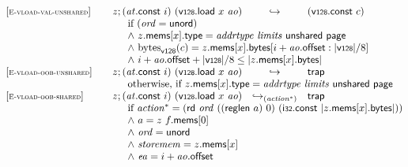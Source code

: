 $$
\begin{array}[t]{@{}lrcl@{}l@{}}
{[\textsc{\scriptsize E{-}vload{-}val{-}unshared}]} \quad & z ; ({\mathit{at}}{.}\mathsf{const}~i)~(\mathsf{v{\scriptstyle 128}}{.}\mathsf{load}~x~{\mathit{ao}}) & \hookrightarrow & (\mathsf{v{\scriptstyle 128}}{.}\mathsf{const}~c) &  \\
& \multicolumn{4}{@{}l@{}}{\quad
\quad
\begin{array}[t]{@{}l@{}}
\mbox{if}~ ({\mathit{ord}} = \mathsf{unord}) \\
{\land}~ z{.}\mathsf{mems}{}[x]{.}\mathsf{type} = {\mathit{addrtype}}~{\mathit{limits}}~\mathsf{unshared}~\mathsf{page} \\
{\land}~ {{\mathrm{bytes}}}_{\mathsf{v{\scriptstyle 128}}}(c) = z{.}\mathsf{mems}{}[x]{.}\mathsf{bytes}{}[i + {\mathit{ao}}{.}\mathsf{offset} : {|\mathsf{v{\scriptstyle 128}}|} / 8] \\
{\land}~ i + {\mathit{ao}}{.}\mathsf{offset} + {|\mathsf{v{\scriptstyle 128}}|} / 8 \leq {|z{.}\mathsf{mems}{}[x]{.}\mathsf{bytes}|} \\
\end{array}
} \\
{[\textsc{\scriptsize E{-}vload{-}oob{-}unshared}]} \quad & z ; ({\mathit{at}}{.}\mathsf{const}~i)~(\mathsf{v{\scriptstyle 128}}{.}\mathsf{load}~x~{\mathit{ao}}) & \hookrightarrow & \mathsf{trap} &  \\
& \multicolumn{4}{@{}l@{}}{\quad
\quad \mbox{otherwise, if}~ z{.}\mathsf{mems}{}[x]{.}\mathsf{type} = {\mathit{addrtype}}~{\mathit{limits}}~\mathsf{unshared}~\mathsf{page}
} \\
{[\textsc{\scriptsize E{-}vload{-}oob{-}shared}]} \quad & z ; ({\mathit{at}}{.}\mathsf{const}~i)~(\mathsf{v{\scriptstyle 128}}{.}\mathsf{load}~x~{\mathit{ao}}) & {\hookrightarrow}_{({{\mathit{action}}^\ast})} {} & \mathsf{trap} &  \\
& \multicolumn{4}{@{}l@{}}{\quad
\quad
\begin{array}[t]{@{}l@{}}
\mbox{if}~ {{\mathit{action}}^\ast} = (\mathsf{rd}~{\mathit{ord}}~((\mathsf{reglen}~a)~0)~(\mathsf{i{\scriptstyle 32}}{.}\mathsf{const}~{|z{.}\mathsf{mems}{}[x]{.}\mathsf{bytes}|})) \\
{\land}~ a = z~f{.}\mathsf{mems}{}[0] \\
{\land}~ {\mathit{ord}} = \mathsf{unord} \\
{\land}~ {\mathit{storemem}} = z{.}\mathsf{mems}{}[x] \\
{\land}~ {\mathit{ea}} = i + {\mathit{ao}}{.}\mathsf{offset} \\

\end{array}}
\end{array}$$
